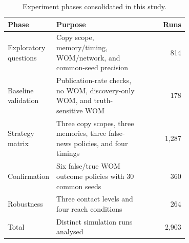 \begin{table}[tbp]
\centering
\caption{Experiment phases consolidated in this study.}
\label{tab:design}
\begin{tabular}{p{0.22\linewidth}p{0.48\linewidth}r}
\toprule
Phase & Purpose & Runs \\
\midrule
Exploratory questions & Copy scope, memory/timing, WOM/network, and common-seed precision & 814 \\
Baseline validation & Publication-rate checks, no WOM, discovery-only WOM, and truth-sensitive WOM & 178 \\
Strategy matrix & Three copy scopes, three memories, three false-news policies, and four timings & 1,287 \\
Confirmation & Six false/true WOM outcome policies with 30 common seeds & 360 \\
Robustness & Three contact levels and four reach conditions & 264 \\
\midrule
Total & Distinct simulation runs analysed & 2,903 \\
\bottomrule
\end{tabular}
\end{table}
